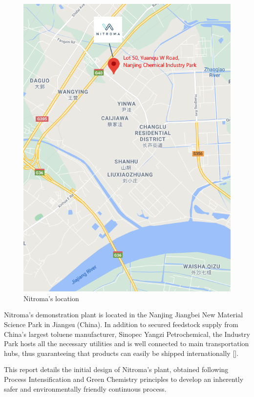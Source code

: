 \begin{figure}
    \centering
    \includegraphics[width=0.3\linewidth]{chapters/0-executive-summary/figures/Location.png}
    \caption{Nitroma's location}
    \label{fig:location}
\end{figure}
Nitroma's demonstration plant is located in the Nanjing Jiangbei New Material Science Park in Jiangsu (China). In addition to secured feedstock supply from China’s largest toluene manufacturer, Sinopec Yangzi Petrochemical, the Industry Park hosts all the necessary utilities and is well connected to main transportation hubs, thus guaranteeing that products can easily be shipped internationally []. 


This report details the initial design of Nitroma's plant, obtained following Process Intensification and Green Chemistry principles to develop an inherently safer and environmentally friendly continuous process.



